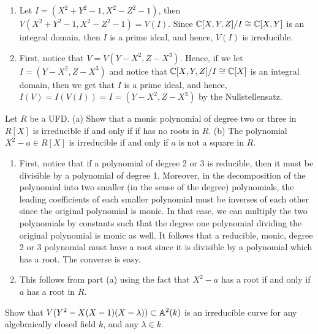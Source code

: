 \begin{solution}
    \begin{enumerate}[label=(\alph*)]
        \item Let $I = (X^2 + Y^2 - 1, X^2 - Z^2 - 1)$, then $V(X^2 + Y^2 - 1, X^2 - Z^2 - 1) = V(I)$. Since $\mathbb{C}[X,Y,Z]/I \cong \mathbb{C}[X,Y]$ is an integral domain, then $I$ is a prime ideal, and hence, $V(I)$ is irreducible.
        \item First, notice that $V = V(Y - X^2, Z - X^3)$. Hence, if we let $I = (Y - X^2, Z - X^3)$ and notice that $\mathbb{C}[X,Y,Z]/I \cong \mathbb{C}[X]$ is an integral domain, then we get that $I$ is a prime ideal, and hence, $I(V) = I(V(I)) = I = (Y - X^2, Z - X^3)$ by the Nullstellensatz. \\
    \end{enumerate}
\end{solution}

\begin{exercise}
    Let $R$ be a UFD. (a) Show that a monic polynomial of degree two or three in $R[X]$ is irreducible if and only if if has no roots in $R$. (b) The polynomial $X^2 - a \in R[X]$ is irreducible if and only if $a$ is not a square in $R$. \\
\end{exercise}

\begin{solution}
    \begin{enumerate}[label=(\alph*)]
        \item First, notice that if a polynomial of degree 2 or 3 is reducible, then it must be divisible by a polynomial of degree 1. Moreover, in the decomposition of the polynomial into two smaller (in the sense of the degree) polynomials, the leading coefficients of each smaller polynomial must be inverses of each other since the original polynomial is monic. In that case, we can multiply the two polynomials by constants such that the degree one polynomial dividing the original polynomial is monic as well. It follows that a reducible, monic, degree 2 or 3 polynomial must have a root since it is divisible by a polynomial which has a root. The converse is easy.
        \item This follows from part (a) using the fact that $X^2 - a$ has a root if and only if $a$ has a root in $R$. \\
    \end{enumerate}
\end{solution}

\begin{exercise}
    Show that $V(Y^2 - X(X-1)(X-\lambda)) \subset \mathbb{A}^2(k)$ is an irreducible curve for any algebraically closed field $k$, and any $\lambda \in k$. \\
\end{exercise}

